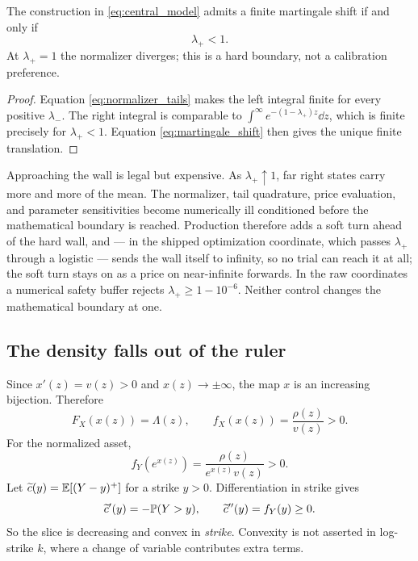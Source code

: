 \documentclass[11pt]{article}
\begin{document}
\begin{proposition}
\label{prop:finite_forward}
The construction in \eqref{eq:central_model} admits a finite martingale shift
if and only if
\begin{equation}
\lambda_+<1.
\label{eq:hard_wall}
\end{equation}
At $\lambda_+=1$ the normalizer diverges; this is a hard boundary, not a
calibration preference.
\end{proposition}

\begin{proof}
Equation \eqref{eq:normalizer_tails} makes the left integral finite for every
positive $\lambda_-$.  The right integral is comparable to
$\int^\infty e^{-(1-\lambda_+)z}\dd z$, which is finite precisely for
$\lambda_+<1$.  Equation \eqref{eq:martingale_shift} then gives the unique
finite translation.
\end{proof}

\begin{caution}
Approaching the wall is legal but expensive.  As $\lambda_+\uparrow1$, far
right states carry more and more of the mean.  The normalizer, tail quadrature,
price evaluation, and parameter sensitivities become numerically ill
conditioned before the mathematical boundary is reached.  Production
therefore adds a soft turn ahead of the hard wall, and --- in the shipped
optimization coordinate, which passes $\lambda_+$ through a logistic ---
sends the wall itself to infinity, so no trial can reach it at all; the
soft turn stays on as a price on near-infinite forwards.  In the raw
coordinates a numerical safety buffer rejects $\lambda_+\ge1-10^{-6}$.
Neither control changes the mathematical boundary at one.
\end{caution}

\subsection{The density falls out of the ruler}

Since $x'(z)=v(z)>0$ and $x(z)\to\pm\infty$, the map $x$ is an increasing
bijection.  Therefore
\begin{equation}
F_X(x(z))=\Lambda(z),\qquad
f_X(x(z))=\frac{\rho(z)}{v(z)}>0.
\label{eq:density_x}
\end{equation}
For the normalized asset,
\begin{equation}
f_Y(e^{x(z)})
=\frac{\rho(z)}{e^{x(z)}v(z)}>0.
\label{eq:density_y}
\end{equation}
Let $\widetilde c(y)=\mathbb{E}[(Y-y)^+]$ for a strike $y>0$.  Differentiation in
strike gives
\begin{equation}
\widetilde c'(y)=-\mathbb{P}(Y>y),\qquad
\widetilde c''(y)=f_Y(y)\ge0.
\label{eq:butterfly_derivatives}
\end{equation}
So the slice is decreasing and convex in \emph{strike}.  Convexity is not
asserted in log-strike $k$, where a change of variable contributes extra
terms.
\end{document}
